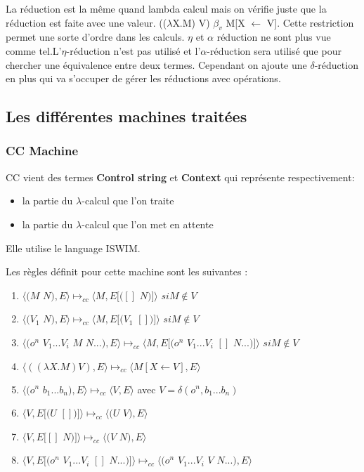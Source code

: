 \documentclass[10pt,a4paper]{article}
\begin{document}
			La réduction est la même quand lambda calcul mais on vérifie juste que la réduction est faite avec une valeur. (($\lambda$X.M) V) $\beta_{v}$ M[X $\longleftarrow$ V]. Cette restriction permet une sorte d'ordre dans les calculs.
			\smallbreak
			$\eta$ et $\alpha$ réduction ne sont plus vue comme tel.L'$\eta$-réduction n'est pas utilisé et l'$\alpha$-réduction sera utilisé que pour chercher une équivalence entre deux termes.
			\medbreak
			Cependant on ajoute une $\delta$-réduction en plus qui va s'occuper de gérer les réductions avec opérations.
			\newpage
			
			\subsection{Les différentes machines traitées}\label{Machine}
			\subsubsection{CC Machine}
			
			CC vient des termes \textbf{Control string} et \textbf{Context} qui représente respectivement:
			\begin{itemize}
				\item la partie du $\lambda$-calcul que l'on traite
				\item la partie du $\lambda$-calcul que l'on met en attente 
			\end{itemize}
			Elle utilise le language ISWIM.
			\bigbreak
			
			Les règles définit pour cette machine sont les suivantes :
			\begin{enumerate}
				\item $\langle(M$ $N),E\rangle \longmapsto_{cc} \langle M,E[([]$ $N)]\rangle$ $si M \notin V$
				\item $\langle(V_{1}$ $N),E\rangle \longmapsto_{cc}  \langle M,E[(V_{1}$ $[])]\rangle$ $ si M \notin V$
				\item $\langle(o^{n}$ $V_{1}...V_{i}$ $M$ $N ...),E\rangle \longmapsto_{cc}  
				\langle M,E[(o^{n}$ $V_{1}...V_{i}$ $[]$ $N ...)]\rangle$ $ si M \notin V$
				\item $\langle((\lambda X.M) V),E\rangle \longmapsto_{cc} \langle M[X\longleftarrow V],E\rangle$
				\item $\langle(o^{n}$ $b_{1}...b_{n}),E\rangle \longmapsto_{cc}  \langle V,E\rangle$ avec $V = \delta(o^{n},b_{1}...b_{n})$ 
				\item $\langle V,E[(U$ $[])]\rangle \longmapsto_{cc} \langle(U$ $V),E\rangle$ 
				\item $\langle V,E[[]$ $N)]\rangle \longmapsto_{cc} \langle(V$ $N),E\rangle$ 
				\item $\langle V,E[(o^{n}$ $V_{1}...V_{i}$ $[]$ $N ...)]\rangle \longmapsto_{cc} \langle(o^{n}$ $V_{1}...V_{i}$ $V$ $N ...),E\rangle$ 
			\end{enumerate}
			\bigbreak
			
\end{document}
